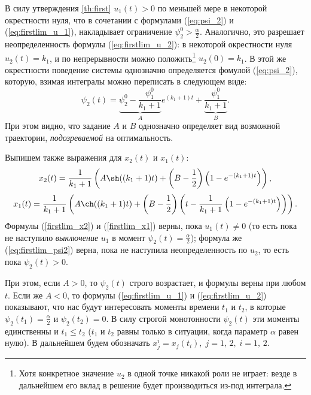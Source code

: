В силу утверждения \ref{th:first} $u_1(t) > 0$ по меньшей мере в некоторой окрестности нуля, что в сочетании с формулами (\ref{eq:psi_2}) и (\ref{eq:firstlim_u_1}), накладывает ограничение $\psi_2^0 > \frac{\alpha}{2}$. Аналогично, это разрешает неопределенность формулы (\ref{eq:firstlim_u_2}): в некоторой окрестности нуля $u_2(t) = k_1$, и по непрерывности можно положить\footnote{Хотя конкретное значение $u_2$ в одной точке никакой роли не играет: везде в дальнейшем его вклад в решение будет производиться из-под интеграла.} $u_2(0) = k_1$. В этой же окрестности поведение системы однозначно определяется фомулой (\ref{eq:psi_2}), которую, взимая интегралы можно переписать в следующем виде:
\begin{equation} \label{eq:firstlim_psi2}
\psi_2(t) = \underbrace{\psi_2^0 - \frac{\psi_1^0}{k_1+1}}_Ae^{(k_1 + 1)t} + \underbrace{\frac{\psi_1^0}{k_1+1}}_B.
\end{equation}
При этом видно, что задание $A$ и $B$ однозначно определяет вид возможной траектории, \textit{подозреваемой} на оптимальность.

Выпишем также выражения для $x_2(t)$ и $x_1(t)$:
\begin{equation}\label{firstlim_x2}
        x_2(t) = \frac{1}{k_1 + 1} \left( A \sh((k_1 + 1) t) + \left( B - \frac{1}{2}\right)\left( 1 - e^{-(k_1 + 1)t}\right)\right),
\end{equation}
\begin{equation}\label{firstlim_x1}
        x_1(t) = \frac{1}{k_1 + 1} \left( A \ch((k_1 + 1) t) + \left( B - \frac{1}{2}\right)\left(t - \frac{1}{k_1 + 1}\left( 1 - e^{-(k_1 + 1)t}\right)\right)\right).
\end{equation}
Формулы (\ref{firstlim_x2}) и (\ref{firstlim_x1}) верны, пока $u_1(t) \neq 0$ (то есть пока не наступило \textit{выключение} $u_1$ в момент $\psi_2(t) = \frac{\alpha}{2}$); формула же (\ref{eq:firstlim_psi2}) верна, пока не наступила неопределенность по $u_2$, то есть пока $\psi_2(t) > 0$. 

При этом, если $A > 0$, то $\psi_2(t)$ строго возрастает, и формулы верны при любом $t$. Если же $A < 0$, то формулы (\ref{eq:firstlim_u_1}) и (\ref{eq:firstlim_u_2}) показывают, что нас будут интересовать моменты времени $t_1$ и $t_2$, в которые $\psi_2(t_1) = \frac{\alpha}{2}$ и $\psi_2(t_2) = 0$. В силу строгой монотонности $\psi_2(t)$ эти моменты единственны и $t_1 \leqslant t_2$ ($t_1$ и $t_2$ равны только в ситуации, когда параметр $\alpha$ равен нулю). В дальнейшем будем обозначать $x_j^i = x_j(t_i),\; j=1,\,2,\;i=1,\,2$.

